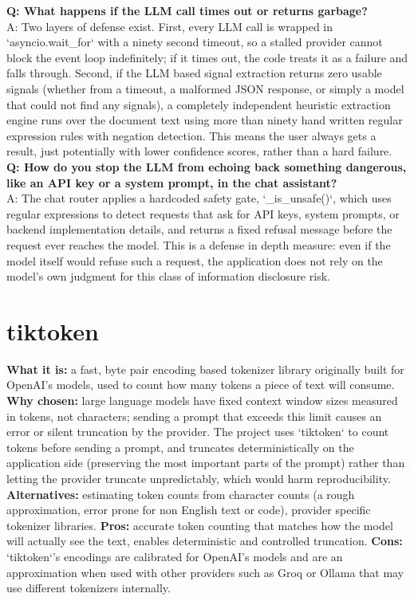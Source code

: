 \documentclass[11pt,a4paper]{report}
\begin{document}
\begin{qabox}
\textbf{Q: What happens if the LLM call times out or returns garbage?} \\
A: Two layers of defense exist. First, every LLM call is wrapped in `asyncio.wait_for` with a ninety second timeout, so a stalled provider cannot block the event loop indefinitely; if it times out, the code treats it as a failure and falls through. Second, if the LLM based signal extraction returns zero usable signals (whether from a timeout, a malformed JSON response, or simply a model that could not find any signals), a completely independent heuristic extraction engine runs over the document text using more than ninety hand written regular expression rules with negation detection. This means the user always gets a result, just potentially with lower confidence scores, rather than a hard failure. \\[4pt]
\textbf{Q: How do you stop the LLM from echoing back something dangerous, like an API key or a system prompt, in the chat assistant?} \\
A: The chat router applies a hardcoded safety gate, `_is_unsafe()`, which uses regular expressions to detect requests that ask for API keys, system prompts, or backend implementation details, and returns a fixed refusal message before the request ever reaches the model. This is a defense in depth measure: even if the model itself would refuse such a request, the application does not rely on the model's own judgment for this class of information disclosure risk.
\end{qabox}

\section{tiktoken}
\textbf{What it is:} a fast, byte pair encoding based tokenizer library originally built for OpenAI's models, used to count how many tokens a piece of text will consume.
\textbf{Why chosen:} large language models have fixed context window sizes measured in tokens, not characters; sending a prompt that exceeds this limit causes an error or silent truncation by the provider. The project uses `tiktoken` to count tokens before sending a prompt, and truncates deterministically on the application side (preserving the most important parts of the prompt) rather than letting the provider truncate unpredictably, which would harm reproducibility.
\textbf{Alternatives:} estimating token counts from character counts (a rough approximation, error prone for non English text or code), provider specific tokenizer libraries.
\textbf{Pros:} accurate token counting that matches how the model will actually see the text, enables deterministic and controlled truncation.
\textbf{Cons:} `tiktoken`'s encodings are calibrated for OpenAI's models and are an approximation when used with other providers such as Groq or Ollama that may use different tokenizers internally.
\end{document}

